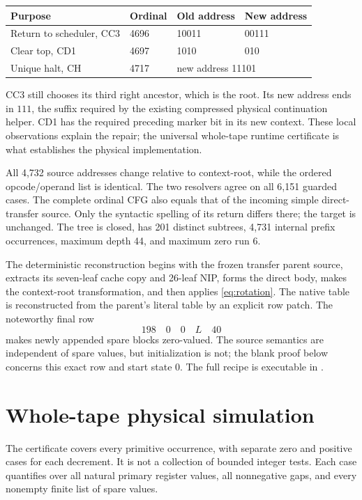 \documentclass[11pt]{article}
\newcommand{\file}[1]{{\small\path{#1}}}
\begin{document}
\begin{center}\small
\begin{tabular}{llll}
\toprule
Purpose & Ordinal & Old address & New address\\
\midrule
Return to scheduler, CC3 &4696&10011&00111\\
Clear top, CD1 &4697&1010&010\\
Unique halt, CH &4717&\multicolumn{2}{l}{new address 11101}\\
\bottomrule
\end{tabular}
\end{center}

CC3 still chooses its third right ancestor, which is the root.
Its new address ends in $111$, the suffix required by the existing
compressed physical continuation helper. CD1 has the required
preceding marker bit in its new context. These local observations
explain the repair; the universal whole-tape runtime certificate is
what establishes the physical implementation.

All 4,732 source addresses change relative to context-root, while
the ordered opcode/operand list is identical. The two resolvers agree
on all 6,151 guarded cases. The complete ordinal CFG also equals
that of the incoming simple direct-transfer source. Only the
syntactic spelling of its return differs there; the target is
unchanged. The tree is closed, has 201 distinct subtrees, 4,731
internal prefix occurrences, maximum depth 44, and maximum zero
run 6.

The deterministic reconstruction begins with the frozen transfer
parent source, extracts its seven-leaf cache copy and 26-leaf NIP,
forms the direct body, makes the context-root transformation, and
then applies \eqref{eq:rotation}. The native table is reconstructed
from the parent's literal table by an explicit row patch. The
noteworthy final row
\[
                         198\quad0\quad0\quad L\quad40
\]
makes newly appended spare blocks zero-valued. The source semantics
are independent of spare values, but initialization is not; the
blank proof below concerns this exact row and start state $0$.
The full recipe is executable in \file{checks/rebuild.py}.

\section{Whole-tape physical simulation}
\label{sec:runtime}

The certificate covers every primitive occurrence, with separate
zero and positive cases for each decrement. It is not a collection
of bounded integer tests. Each case quantifies over all natural
primary register values, all nonnegative gaps, and every nonempty
finite list of spare values.
\end{document}
